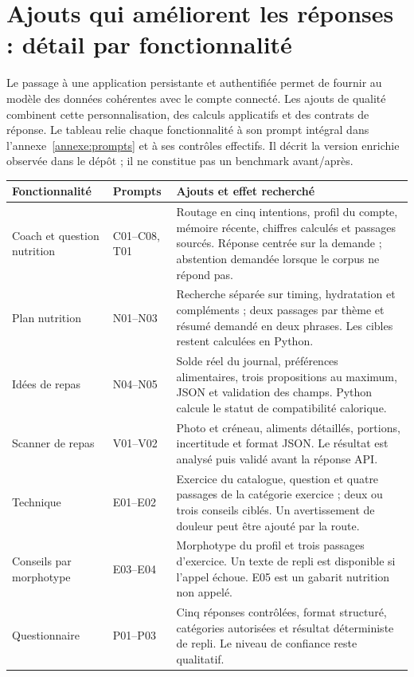 \clearpage
\section{Ajouts qui améliorent les réponses : détail par fonctionnalité}
\label{sec:ajouts-ia}
Le passage à une application persistante et authentifiée permet de fournir au modèle des données cohérentes avec le compte connecté. Les ajouts de qualité combinent cette personnalisation, des calculs applicatifs et des contrats de réponse. Le tableau relie chaque fonctionnalité à son prompt intégral dans l'annexe~\ref{annexe:prompts} et à ses contrôles effectifs. Il décrit la version enrichie observée dans le dépôt ; il ne constitue pas un benchmark avant/après.

\begin{table}[H]
\small
\begin{tabularx}{\linewidth}{p{2.8cm}p{1.7cm}X}
\toprule
\textbf{Fonctionnalité} & \textbf{Prompts} & \textbf{Ajouts et effet recherché} \\
\midrule
Coach et question nutrition & C01--C08, T01 & Routage en cinq intentions, profil du compte, mémoire récente, chiffres calculés et passages sourcés. Réponse centrée sur la demande ; abstention demandée lorsque le corpus ne répond pas. \\
Plan nutrition & N01--N03 & Recherche séparée sur timing, hydratation et compléments ; deux passages par thème et résumé demandé en deux phrases. Les cibles restent calculées en Python. \\
Idées de repas & N04--N05 & Solde réel du journal, préférences alimentaires, trois propositions au maximum, JSON et validation des champs. Python calcule le statut de compatibilité calorique. \\
Scanner de repas & V01--V02 & Photo et créneau, aliments détaillés, portions, incertitude et format JSON. Le résultat est analysé puis validé avant la réponse API. \\
Technique & E01--E02 & Exercice du catalogue, question et quatre passages de la catégorie exercice ; deux ou trois conseils ciblés. Un avertissement de douleur peut être ajouté par la route. \\
Conseils par morphotype & E03--E04 & Morphotype du profil et trois passages d'exercice. Un texte de repli est disponible si l'appel échoue. E05 est un gabarit nutrition non appelé. \\
Questionnaire & P01--P03 & Cinq réponses contrôlées, format structuré, catégories autorisées et résultat déterministe de repli. Le niveau de confiance reste qualitatif. \\

\end{tabularx}
\end{table}

